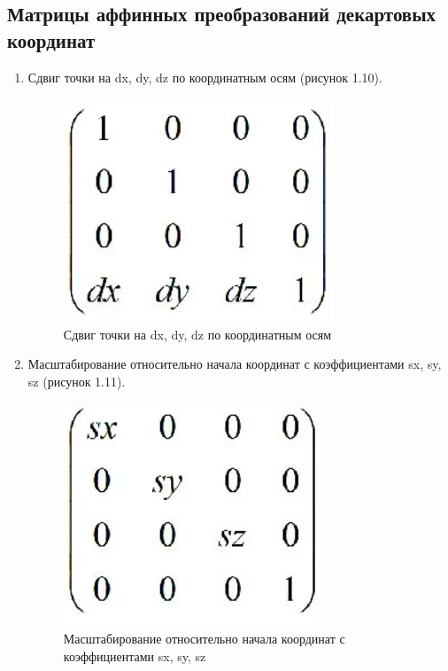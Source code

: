 \documentclass[12pt,a4paper,oneside]{report}
\begin{document}
	\subsection{Матрицы аффинных преобразований декартовых координат}
	\begin{enumerate}
		\item Сдвиг точки на dx, dy, dz по координатным осям (рисунок 1.10).
		\begin{figure}[H]
			\centering
			\includegraphics[width = .5\linewidth]{translation}
			\caption{Сдвиг точки на dx, dy, dz по координатным осям}
		\end{figure}
		
		\item Масштабирование относительно начала координат с коэффициентами sx, sy, sz (рисунок 1.11).
		\begin{figure}[H]
			\centering
			\includegraphics[width = .5\linewidth]{scale}
			\caption{Масштабирование относительно начала координат с коэффициентами sx, sy, sz}
		\end{figure}
	

\end{enumerate}
\end{document}
